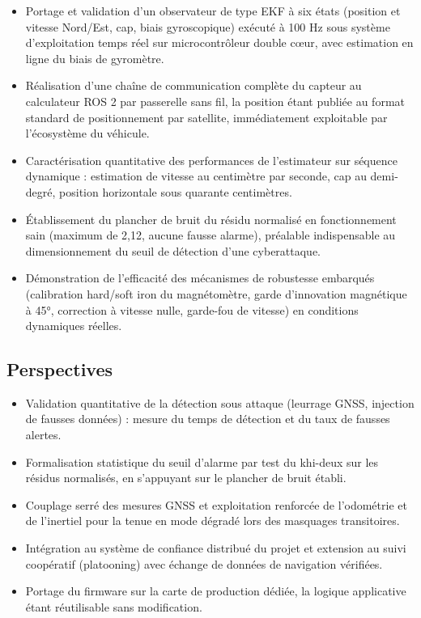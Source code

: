 \begin{itemize}
\item Portage et validation d’un observateur de type EKF à six états (position et vitesse Nord/Est, cap, biais gyroscopique) exécuté à 100 Hz sous système d’exploitation temps réel sur microcontrôleur double cœur, avec estimation en ligne du biais de gyromètre.
\item Réalisation d’une chaîne de communication complète du capteur au calculateur ROS 2 par passerelle sans fil, la position étant publiée au format standard de positionnement par satellite, immédiatement exploitable par l’écosystème du véhicule.
\item Caractérisation quantitative des performances de l’estimateur sur séquence dynamique : estimation de vitesse au centimètre par seconde, cap au demi-degré, position horizontale sous quarante centimètres.
\item Établissement du plancher de bruit du résidu normalisé en fonctionnement sain (maximum de 2,12, aucune fausse alarme), préalable indispensable au dimensionnement du seuil de détection d’une cyberattaque.
\item Démonstration de l’efficacité des mécanismes de robustesse embarqués (calibration hard/soft iron du magnétomètre, garde d’innovation magnétique à 45°, correction à vitesse nulle, garde-fou de vitesse) en conditions dynamiques réelles.
\end{itemize}

\subsection{Perspectives}

\begin{itemize}
\item Validation quantitative de la détection sous attaque (leurrage GNSS, injection de fausses données) : mesure du temps de détection et du taux de fausses alertes.
\item Formalisation statistique du seuil d’alarme par test du khi-deux sur les résidus normalisés, en s’appuyant sur le plancher de bruit établi.
\item Couplage serré des mesures GNSS et exploitation renforcée de l’odométrie et de l’inertiel pour la tenue en mode dégradé lors des masquages transitoires.
\item Intégration au système de confiance distribué du projet et extension au suivi coopératif (platooning) avec échange de données de navigation vérifiées.
\item Portage du firmware sur la carte de production dédiée, la logique applicative étant réutilisable sans modification.
\end{itemize}

